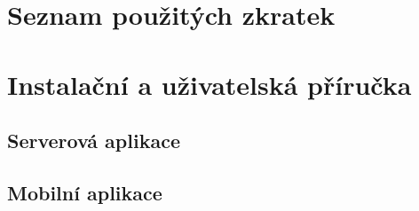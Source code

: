 \chapter{Seznam použitých zkratek}
\renewcommand{\glossarysection}[2][]{}
\printglossary[type=acronym]



\chapter{Instalační a uživatelská příručka}
\section{Serverová aplikace}

\section{Mobilní aplikace}
% 
% 
